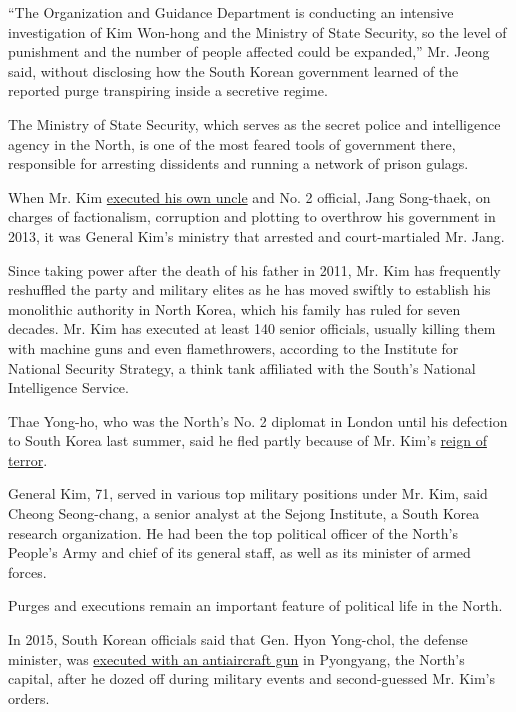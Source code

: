 ``The Organization and Guidance Department is conducting an intensive
investigation of Kim Won-hong and the Ministry of State Security, so the
level of punishment and the number of people affected could be
expanded,'' Mr. Jeong said, without disclosing how the South Korean
government learned of the reported purge transpiring inside a secretive
regime.

The Ministry of State Security, which serves as the secret police and
intelligence agency in the North, is one of the most feared tools of
government there, responsible for arresting dissidents and running a
network of prison gulags.

When Mr. Kim
\href{http://www.nytimes.com/2013/12/14/world/asia/execution-raises-doubts-about-kims-grip-on-north-korea.html}{executed
his own uncle} and No. 2 official, Jang Song-thaek, on charges of
factionalism, corruption and plotting to overthrow his government in
2013, it was General Kim's ministry that arrested and court-martialed
Mr. Jang.

Since taking power after the death of his father in 2011, Mr. Kim has
frequently reshuffled the party and military elites as he has moved
swiftly to establish his monolithic authority in North Korea, which his
family has ruled for seven decades. Mr. Kim has executed at least 140
senior officials, usually killing them with machine guns and even
flamethrowers, according to the Institute for National Security
Strategy, a think tank affiliated with the South's National Intelligence
Service.

Thae Yong-ho, who was the North's No. 2 diplomat in London until his
defection to South Korea last summer, said he fled partly because of Mr.
Kim's
\href{https://www.nytimes.com/2017/01/25/world/asia/north-korea-defector.html}{reign
of terror}.

General Kim, 71, served in various top military positions under Mr. Kim,
said Cheong Seong-chang, a senior analyst at the Sejong Institute, a
South Korea research organization. He had been the top political officer
of the North's People's Army and chief of its general staff, as well as
its minister of armed forces.

Purges and executions remain an important feature of political life in
the North.

In 2015, South Korean officials said that Gen. Hyon Yong-chol, the
defense minister, was
\href{https://www.nytimes.com/2015/05/13/world/asia/north-korea-said-to-execute-a-top-official.html}{executed
with an antiaircraft gun} in Pyongyang, the North's capital, after he
dozed off during military events and second-guessed Mr. Kim's orders.

